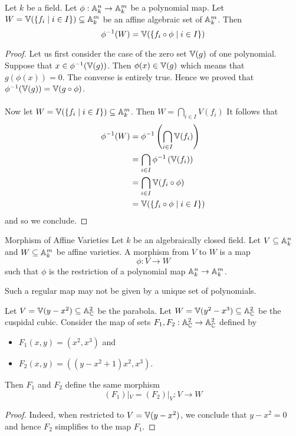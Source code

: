 \documentclass[a4paper]{article}
\begin{document}
\begin{prp}{}{} Let $k$ be a field. Let $\phi:\mathbb{A}_k^n\to\mathbb{A}_k^m$ be a polynomial map. Let $W=\mathbb{V}(\{f_i\;|\;i\in I\})\subseteq\mathbb{A}_k^m$ be an affine algebraic set of $\mathbb{A}_k^m$. Then $$\phi^{-1}(W)=\mathbb{V}(\{f_i\circ\phi\;|\;i\in I\})$$ \tcbline
\begin{proof}
Let us first consider the case of the zero set $\mathbb{V}(g)$ of one polynomial. Suppose that $x\in\phi^{-1}(\mathbb{V}(g))$. Then $\phi(x)\in\mathbb{V}(g)$ which means that $g(\phi(x))=0$. The converse is entirely true. Hence we proved that $\phi^{-1}(\mathbb{V}(g))=\mathbb{V}(g\circ\phi)$. \\~\\

Now let $W=\mathbb{V}(\{f_i\;|\;i\in I\})\subseteq\mathbb{A}_k^m$. Then $W=\bigcap_{i\in I}V(f_i)$ It follows that 
\begin{align*}
\phi^{-1}(W)&=\phi^{-1}\left(\bigcap_{i\in I}\mathbb{V}(f_i)\right)\\
&=\bigcap_{i\in I}\phi^{-1}\left(\mathbb{V}(f_i)\right)\\
&=\bigcap_{i\in I}\mathbb{V}(f_i\circ\phi)\\
&=\mathbb{V}(\{f_i\circ\phi\;|\;i\in I\})
\end{align*}
and so we conclude. 
\end{proof}
\end{prp}

\begin{defn}{Morphism of Affine Varieties}{} Let $k$ be an algebraically closed field. Let $V\subseteq\mathbb{A}_k^n$ and $W\subseteq\mathbb{A}_k^m$ be affine varieties. A morphism from $V$ to $W$ is a map $$\phi:V\to W$$ such that $\phi$ is the restriction of a polynomial map $\mathbb{A}_k^n\to\mathbb{A}_k^m$. 
\end{defn}

Such a regular map may not be given by a unique set of polynomials. 

\begin{eg}{}{} Let $V=\mathbb{V}(y-x^2)\subseteq\mathbb{A}_{\mathbb{C}}^2$ be the parabola. Let $W=\mathbb{V}(y^2-x^3)\subseteq\mathbb{A}_{\mathbb{C}}^2$ be the cuspidal cubic. Consider the map of sets $F_1,F_2:\mathbb{A}_{\mathbb{C}}^2\to\mathbb{A}_{\mathbb{C}}^2$ defined by
\begin{itemize}
\item $F_1(x,y)=(x^2,x^3)$ and 
\item $F_2(x,y)=((y-x^2+1)x^2,x^3)$. 
\end{itemize}
Then $F_1$ and $F_2$ define the same morphism $$(F_1)|_V=(F_2)|_V:V\to W$$ \tcbline
\begin{proof}
Indeed, when restricted to $V=\mathbb{V}(y-x^2)$, we conclude that $y-x^2=0$ and hence $F_2$ simplifies to the map $F_1$. 
\end{proof}
\end{eg}
\end{document}
